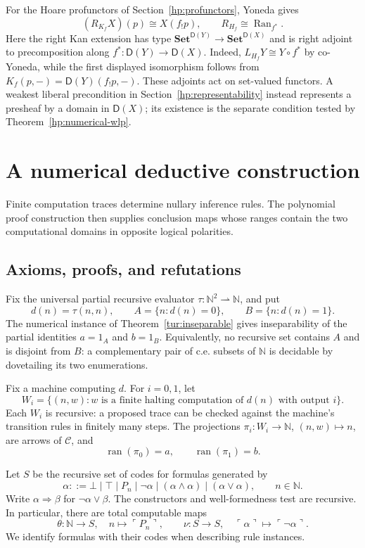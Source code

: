 \documentclass[11pt]{article}
\theoremstyle{definition}
\theoremstyle{remark}
\newcommand{\D}{\mathsf D}
\newcommand{\ran}{\operatorname{ran}}
\newcommand{\Set}{\mathbf{Set}}
\newcommand{\N}{\mathbb N}
\begin{document}
For the Hoare profunctors of Section~\ref{hp:profunctors}, Yoneda gives
\[
 (R_{K_f}X)(p)\cong X(f_!p),\qquad
 R_{H_f}\cong\operatorname{Ran}_{f^*}.
\]
Here the right Kan extension has type
$\Set^{\D(Y)}\to\Set^{\D(X)}$ and is right adjoint to
precomposition along $f^*:\D(Y)\to\D(X)$. Indeed,
$L_{H_f}Y\cong Y\circ f^*$ by co-Yoneda, while the first displayed
isomorphism follows from
$K_f(p,-)=\D(Y)(f_!p,-)$.
These adjoints act on set-valued functors. A weakest liberal precondition
in Section~\ref{hp:representability} instead represents a presheaf by
a domain in $\D(X)$; its existence is the separate condition tested by
Theorem~\ref{hp:numerical-wlp}.

\section{A numerical deductive construction}
\label{num:section}

Finite computation traces determine nullary inference rules. The polynomial
proof construction then supplies conclusion maps whose ranges contain the
two computational domains in opposite logical polarities.

\subsection{Axioms, proofs, and refutations}

Fix the universal partial recursive evaluator
$\tau:\N^2\rightharpoonup\N$, and put
\[
 d(n)=\tau(n,n),\qquad
 A=\{n:d(n)=0\},\qquad B=\{n:d(n)=1\}.
\]
The numerical instance of Theorem~\ref{tur:inseparable} gives
inseparability of the partial identities $a=1_A$ and $b=1_B$.
Equivalently, no recursive set contains $A$ and is disjoint from $B$:
a complementary pair of c.e. subsets of $\N$ is decidable by dovetailing
its two enumerations.

Fix a machine computing $d$. For $i=0,1$, let
\[
 W_i=\{(n,w):w\text{ is a finite halting computation of }d(n)
                    \text{ with output }i\}.
\]
Each $W_i$ is recursive: a proposed trace can be checked against the
machine's transition rules in finitely many steps. The projections
$\pi_i:W_i\to\N$, $(n,w)\mapsto n$, are arrows of $\mathscr C$, and
\[
 \ran(\pi_0)=a,\qquad \ran(\pi_1)=b.
\]

Let $S$ be the recursive set of codes for formulas generated by
\[
 \alpha::=\bot\mid\top\mid P_n\mid\neg\alpha
     \mid(\alpha\land\alpha)\mid(\alpha\lor\alpha),
 \qquad n\in\N.
\]
Write $\alpha\Rightarrow\beta$ for $\neg\alpha\lor\beta$.
The constructors and well-formedness test are recursive. In particular,
there are total computable maps
\[
 \theta:\N\longrightarrow S,\quad n\longmapsto\ulcorner P_n\urcorner,
 \qquad
 \nu:S\longrightarrow S,\quad
 \ulcorner\alpha\urcorner\longmapsto\ulcorner\neg\alpha\urcorner.
\]
We identify formulas with their codes when describing rule instances.
\end{document}
